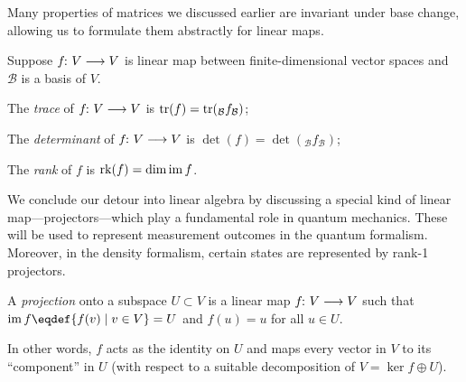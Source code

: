 \documentclass[a4paper, oneside, 12pt]{amsart}
\begin{document}
Many properties of matrices we discussed earlier are invariant under base change, allowing us to formulate them abstractly for linear maps.
\begin{definition}\label{def:trace-of-an-endomorphism}
  Suppose \(f\from V \to V\) is linear map between finite-dimensional vector spaces and \(\mathcal{B}\) is a basis of \(V\).
  \begin{thmlist}
    \item The \emph{trace} of \(f\from V \to V\) is \(\operatorname{tr}(f) = \operatorname{tr}(_{\mathcal{B}}f_{\mathcal{B}})\);
    \item The \emph{determinant} of \(f \from V\to V\) is \(\det(f) = \det(_{\mathcal{B}}f_{\mathcal{B}})\);
    \item The \emph{rank} of \(f\) is \(\operatorname{rk}(f) = \dim \operatorname{im} f\).
  \end{thmlist}
\end{definition}

We conclude our detour into linear algebra by discussing a special kind of linear map---projectors---which play a fundamental role in quantum mechanics.
These will be used to represent measurement outcomes in the quantum formalism. Moreover, in the density formalism, certain states are represented by rank-1 projectors.

\begin{definition}\label{def:projection}
  A \emph{projection} onto a subspace \(U \subset V\) is a linear map \(f\from V \to V\) such that \(\im f \eqdef\{ f(v) \mid v \in V\} = U\) and \(f(u) = u \) for all \(u \in U\).
\end{definition}

In other words, \( f \) acts as the identity on \( U \) and maps every vector in \( V \) to its ``component'' in \( U \) (with respect to a suitable decomposition of \( V= \ker f \oplus U \)).
\end{document}
